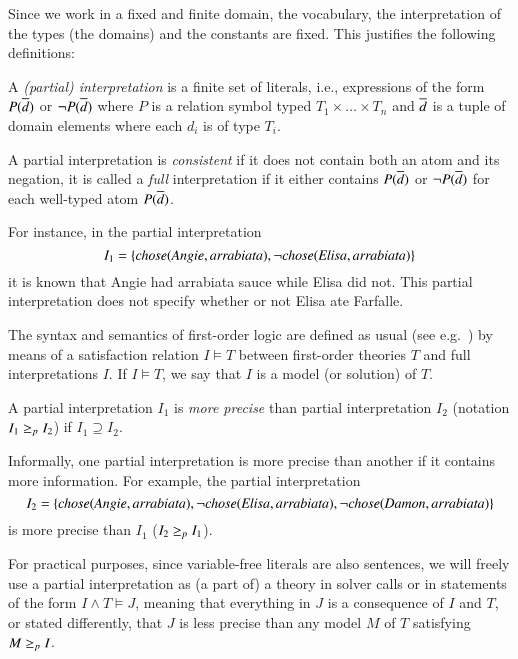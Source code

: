 Since we work in a fixed and finite domain, the vocabulary, the interpretation of the types (the domains) and the constants are fixed.
This justifies the following definitions: 
\begin{definition}\label{def:partial-interpretation}
 A \emph{(partial) interpretation} is a finite set of literals, i.e., expressions of the form $P(\overline{d})$ or $\lnot P(\overline{d})$ where $P$ is a relation symbol typed $T_1\times\dots \times T_n$ and $\overline{d}$ is a tuple of domain elements where each $d_i$ is of type $T_i$. 
\end{definition}
 \begin{definition}\label{def:consistent}
 A partial interpretation is \emph{consistent} if it does not contain both an atom and its negation, it is called a \emph{full} interpretation if it either contains $P(\overline{d})$ or $\lnot P(\overline{d})$ for each well-typed atom $P(\overline{d})$. 
\end{definition}

For instance, in the partial interpretation 
\[ 
I_1=\{\mathit{chose}(\mathit{Angie},\mathit{arrabiata}), \lnot \mathit{chose}(\mathit{Elisa},\mathit{arrabiata})\}
 \] 
it is known that Angie had arrabiata sauce while Elisa did not. This partial interpretation does not specify whether or not Elisa ate Farfalle.  


The syntax and semantics of first-order logic are defined as usual (see e.g.\ \cite{enderton}) by means of a satisfaction relation $I \models T$ between first-order theories $T$ and full interpretations $I$. If $I\models T$, we say that $I$ is a model (or solution) of $T$.


\begin{definition} %
	A partial interpretation $I_1$ is \emph{more precise} than partial interpretation $I_2$ (notation $I_1\geq_p I_2$) if $I_1\supseteq I_2$.
\end{definition}

Informally, one partial interpretation is more precise than another if it contains more information. For example, the partial interpretation 
\[I_2 =\{\mathit{chose}(\mathit{Angie},  \mathit{arrabiata}), \lnot \mathit{chose}(\mathit{Elisa},\mathit{arrabiata}),  \lnot \mathit{chose}(\mathit{Damon},\mathit{arrabiata})\}\]
is more precise than $I_1$ ($I_2 \geq_p I_1$).


For practical purposes, since variable-free literals are also sentences, we will freely use a partial interpretation as (a part of) a theory in solver calls or in statements of the form $I\land T \models J$, meaning that everything in $J$ is a consequence of $I$ and $T$, or stated differently, that $J$ is less precise than any model $M$ of $T$ satisfying $M\geq_p I$. 

